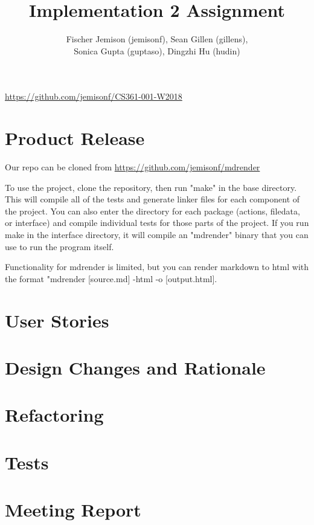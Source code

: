 \documentclass[12pt]{article}
\title{Implementation 2 Assignment}
\author{Fischer Jemison (jemisonf), Sean Gillen (gillens), \\
Sonica Gupta (guptaso), Dingzhi Hu (hudin) }
\begin{document}
\maketitle
\centerline{\url{https://github.com/jemisonf/CS361-001-W2018}}
\tableofcontents

\section{Product Release}

Our repo can be cloned from \url{https://github.com/jemisonf/mdrender}

To use the project, clone the repository, then run "make" in the base directory. This will compile all of the tests and generate linker files for each component of the project. You can also enter the directory for each package (actions, filedata, or interface) and compile individual tests for those parts of the project. If you run make in the interface directory, it will compile an "mdrender" binary that you can use to run the program itself.

Functionality for mdrender is limited, but you can render markdown to html with the format "mdrender [source.md] -html -o [output.html]. \section{User Stories}
 \section{Design Changes and Rationale}
 \section{Refactoring}
 \section{Tests}
 \section{Meeting Report}
 
\end{document}
